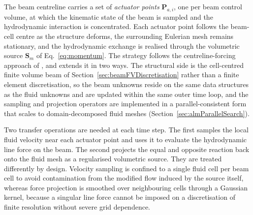 \noindent
The beam centreline carries a set of \emph{actuator points} $\mathbf{P}_{a,i}$, one per beam control volume, at which the kinematic state of the beam is sampled and the hydrodynamic interaction is concentrated. Each actuator point follows the beam-cell centre as the structure deforms, the surrounding Eulerian mesh remains stationary, and the hydrodynamic exchange is realised through the volumetric source $\mathbf{S}_{m}$ of Eq.~\eqref{eq:momentum}. The strategy follows the centreline-forcing approach of \citet{bral_development_2025,bral_modeling_2025}, and extends it in two ways. The structural side is the cell-centred finite volume beam of Section~\ref{sec:beamFVDiscretisation} rather than a finite element discretisation, so the beam unknowns reside on the same data structures as the fluid unknowns and are updated within the same outer time loop, and the sampling and projection operators are implemented in a parallel-consistent form that scales to domain-decomposed fluid meshes (Section~\ref{sec:almParallelSearch}).

\noindent
Two transfer operations are needed at each time step. The first samples the local fluid velocity near each actuator point and uses it to evaluate the hydrodynamic line force on the beam. The second projects the equal and opposite reaction back onto the fluid mesh as a regularised volumetric source. They are treated differently by design. Velocity sampling is confined to a single fluid cell per beam cell to avoid contamination from the modified flow induced by the source itself, whereas force projection is smoothed over neighbouring cells through a Gaussian kernel, because a singular line force cannot be imposed on a discretisation of finite resolution without severe grid dependence.

